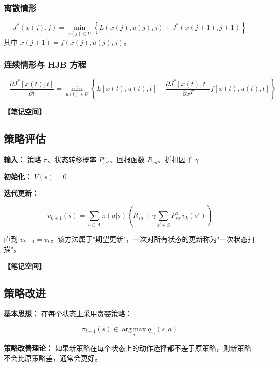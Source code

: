 \documentclass[12pt,a4paper]{article}
\newcommand{\notespace}[1][3cm]{%
  \vspace{#1}%
  \noindent\textbf{【笔记空间】}%
  \vspace{#1}%
}
\newcommand{\1}{\mathbf{1}}
\newcommand{\argmax}{\operatorname*{arg\,max}}
\begin{document}
\subsubsection*{离散情形}

\begin{equation}
J^*(x(j),j) = \min_{u(j)\in U} \left\{ L(x(j),u(j),j)+J^*(x(j+1),j+1) \right\}
\end{equation}
其中 $x(j+1)=f(x(j),u(j),j)$。

\subsubsection*{连续情形与 HJB 方程}

\begin{equation}
-\frac{\partial J^*[x(t),t]}{\partial t} = \min_{u(t)\in U} \left\{ L[x(t),u(t),t] + \frac{\partial J^*[x(t),t]}{\partial x^T}f[x(t),u(t),t] \right\}
\end{equation}

\notespace[2cm]

\subsection{策略评估}

\textbf{输入：} 策略 $\pi$、状态转移概率 $P_{ss'}^a$、回报函数 $R_{sa}$、折扣因子 $\gamma$

\textbf{初始化：} $V(s)=0$

\textbf{迭代更新：}

\begin{equation}
v_{k+1}(s) = \sum_{a\in A}\pi(a|s)\left(R_{sa} + \gamma\sum_{s'\in S}P_{ss'}^a v_k(s')\right)
\end{equation}

直到 $v_{k+1} = v_k$。该方法属于"期望更新"，一次对所有状态的更新称为"一次状态扫描"。

\notespace[2cm]

\subsection{策略改进}

\textbf{基本思想：} 在每个状态上采用贪婪策略：

\begin{equation}
\pi_{l+1}(s)\in \argmax_a q_{\pi_l}(s,a)
\end{equation}

\textbf{策略改善理论：} 如果新策略在每个状态上的动作选择都不差于原策略，则新策略不会比原策略差，通常会更好。
\end{document}

